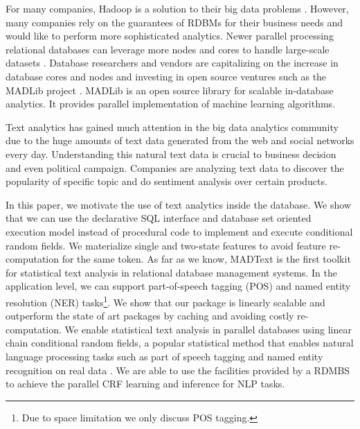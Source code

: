 \documentclass[11pt,letterpaper]{article}
\begin{document}
For many companies, Hadoop is a solution to their big data problems \cite{DBLP:journals/corr/abs-1209-2191}. 
However, many companies rely on the guarantees of RDBMs for their business needs and would like to 
perform more sophisticated analytics.
Newer parallel processing relational databases can leverage more nodes and cores to handle large-scale datasets
 \cite{DeWitt:1992:PDS:129888.129894,Stonebraker:2012:NON:2366316.2366319}. 
Database researchers and vendors are capitalizing on the increase in database cores and nodes
and investing in open source ventures such as the MADLib project \cite {Cohen:2009:MSN:1687553.1687576,Hellerstein:2012:MAL:2367502.2367510}. 
MADLib is an open source library for scalable in-database analytics.
It provides parallel implementation of machine learning algorithms.

Text analytics has gained much attention in the big data analytics community due to the huge amounts of text data generated from the web and 
social networks every day.
Understanding this natural text data is crucial to business decision and even political campaign. 
Companies are analyzing text data to discover the popularity of specific topic and do sentiment analysis over certain products.

In this paper, we motivate the use of text analytics inside the database.
We show that we can use the declarative SQL interface and database set oriented execution model instead of procedural code to 
implement and execute 
conditional random fields. 
We materialize  single and two-state features to avoid feature re-computation for the same token.  
As far as we know, MADText is the first toolkit for statistical text analysis in relational database management systems.  
In the application level, we can support part-of-speech tagging (POS) and  named entity resolution (NER) tasks\footnote{Due to space limitation we only discuss POS tagging.}.  
We show that our package is linearly scalable and outperform the state of art packages by caching and avoiding costly re-computation.
We enable statistical text analysis in parallel databases using linear chain conditional random fields, a
popular statistical method that enables
natural language processing tasks such as part of speech tagging and named entity recognition on
real data \cite{DBLP:conf/icml/LaffertyMP01}.
We are able to use the facilities provided by a RDMBS to achieve the parallel CRF learning and inference for NLP tasks.
\end{document}
